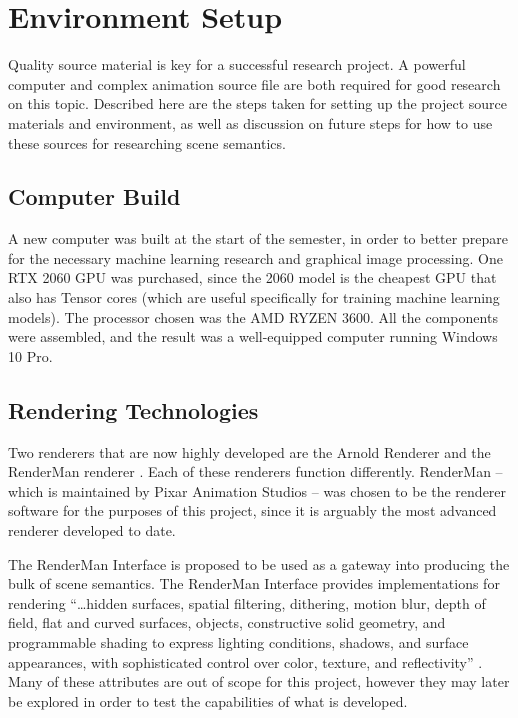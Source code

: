 \documentclass[conference]{IEEEtran}
\begin{document}
\section{Environment Setup}
Quality source material is key for a successful research project.
A powerful computer and complex animation source file are both required
for good research on this topic.
Described here are the steps taken for setting up the project
source materials and environment, as well as discussion on future steps
for how to use these sources for researching scene semantics.

\subsection{Computer Build}
A new computer was built at the start of the semester, in order to better prepare for the necessary machine learning
research and graphical image processing. One RTX 2060 GPU was purchased,
since the 2060 model is the cheapest GPU that also has Tensor cores
(which are useful specifically for training machine learning models).
The processor chosen was the AMD RYZEN 3600.
All the components were assembled,
and the result was a well-equipped computer running Windows 10 Pro.

\subsection{Rendering Technologies}
Two renderers that are now highly developed are the Arnold Renderer \cite{arnold}
and the RenderMan renderer \cite{renderman}. Each of these renderers
function differently.
RenderMan -- which is maintained by Pixar Animation Studios --
was chosen to be the renderer software for the purposes of this project,
since it is arguably the most advanced renderer developed to date.

The RenderMan Interface is proposed to be used as a gateway
into producing the bulk of scene semantics.
The RenderMan Interface provides implementations for rendering
``\dots hidden surfaces, spatial filtering, dithering, motion blur, depth of field,
flat and curved surfaces, objects, constructive solid geometry,
and programmable shading to express lighting conditions, shadows, and surface appearances,
with sophisticated control over color, texture, and reflectivity''
\cite{renderman_docs}.
Many of these attributes are out of scope
for this project, however they may later be explored in order to test the capabilities
of what is developed.
\end{document}
